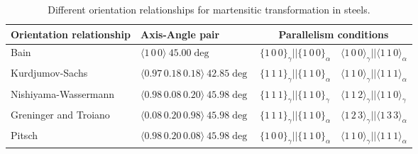 
\begin{table*}[t]
  \begin{tabular}{ l l l l }
  \hline\hline
      Orientation relationship & Axis-Angle pair & \multicolumn{2}{c}{Parallelism conditions} \\
      \hline
      Bain \cite{bain1924nature} &
      $\langle1\,0\,0\rangle\:45.00\deg$ &
      $\{1\,0\,0\}_{\gamma} || \{1\,0\,0\}_{\alpha}$ &
      $\langle1\,0\,0\rangle_{\gamma} || \langle1\,1\,0\rangle_{\alpha}$ \\
      
      Kurdjumov-Sachs \cite{kurdjumow1930mechanismus} &
      $\langle0.97\,0.18\,0.18\rangle\:42.85\deg$ &
      $\{1\,1\,1\}_{\gamma} || \{1\,1\,0\}_{\alpha}$ &
      $\langle1\,1\,0\rangle_{\gamma} || \langle1\,1\,1\rangle_{\alpha}$ \\
      
      Nishiyama-Wassermann \cite{nishiyama1934x,wassermann1935ueber} &
      $\langle0.98\,0.08\,0.20\rangle\:45.98\deg$ &
      $\{1\,1\,1\}_{\gamma} || \{1\,1\,0\}_{\gamma}$ &
      $\langle1\,1\,2\rangle_{\gamma} || \langle1\,1\,0\rangle_{\gamma}$ \\
      
      Greninger and Troiano \cite{greninger1949mechanism} &
      $\langle0.08\,0.20\,0.98\rangle\:45.98\deg$ &
      $\{1\,1\,1\}_{\gamma} || \{1\,1\,0\}_{\alpha}$ &
      $\langle1\,2\,3\rangle_{\gamma} || \langle1\,3\,3\rangle_{\alpha}$ \\
      
      Pitsch \cite{pitsch1962orientierungszusammenhang} &
      $\langle0.98\,0.20\,0.08\rangle\:45.98\deg$ &
      $\{1\,0\,0\}_{\gamma} || \{1\,1\,0\}_{\alpha}$ &
      $\langle1\,1\,0\rangle_{\gamma} || \langle1\,1\,1\rangle_{\alpha}$ \\
  \hline
  \end{tabular}
  \caption{\label{tab:ORs}Different orientation relationships for martensitic transformation in steels.}
  \end{table*}
  